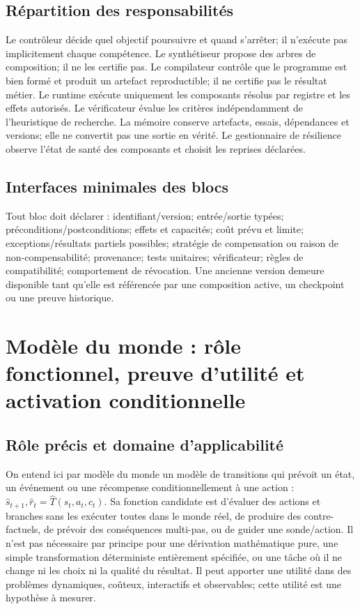 \documentclass[11pt,a4paper]{article}
\theoremstyle{definition}
\theoremstyle{plain}
\theoremstyle{remark}
\begin{document}
\subsection{Répartition des responsabilités}
Le contrôleur décide quel objectif poursuivre et quand s'arrêter; il n'exécute pas implicitement chaque compétence. Le synthétiseur propose des arbres de composition; il ne les certifie pas. Le compilateur contrôle que le programme est bien formé et produit un artefact reproductible; il ne certifie pas le résultat métier. Le runtime exécute uniquement les composants résolus par registre et les effets autorisés. Le vérificateur évalue les critères indépendamment de l'heuristique de recherche. La mémoire conserve artefacts, essais, dépendances et versions; elle ne convertit pas une sortie en vérité. Le gestionnaire de résilience observe l'état de santé des composants et choisit les reprises déclarées.

\subsection{Interfaces minimales des blocs}
Tout bloc doit déclarer : identifiant/version; entrée/sortie typées; préconditions/postconditions; effets et capacités; coût prévu et limite; exceptions/résultats partiels possibles; stratégie de compensation ou raison de non-compensabilité; provenance; tests unitaires; vérificateur; règles de compatibilité; comportement de révocation. Une ancienne version demeure disponible tant qu'elle est référencée par une composition active, un checkpoint ou une preuve historique.

\section{Modèle du monde : rôle fonctionnel, preuve d'utilité et activation conditionnelle}
\subsection{Rôle précis et domaine d'applicabilité}
On entend ici par modèle du monde un modèle de transitions qui prévoit un état, un événement ou une récompense conditionnellement à une action : $\hat{s}_{t+1},\hat{r}_t=\hat{T}(s_t,a_t,c_t)$. Sa fonction candidate est d'évaluer des actions et branches sans les exécuter toutes dans le monde réel, de produire des contre-factuels, de prévoir des conséquences multi-pas, ou de guider une sonde/action. Il n'est pas nécessaire par principe pour une dérivation mathématique pure, une simple transformation déterministe entièrement spécifiée, ou une tâche où il ne change ni les choix ni la qualité du résultat. Il peut apporter une utilité dans des problèmes dynamiques, coûteux, interactifs et observables; cette utilité est une hypothèse à mesurer.
\end{document}
